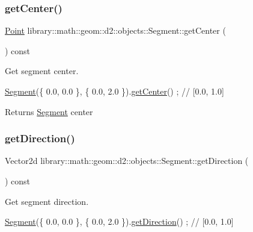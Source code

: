 \subsubsection{\texorpdfstring{get\+Center()}{getCenter()}}
{\footnotesize\ttfamily \hyperlink{classlibrary_1_1math_1_1geom_1_1d2_1_1objects_1_1_point}{Point} library\+::math\+::geom\+::d2\+::objects\+::\+Segment\+::get\+Center (\begin{DoxyParamCaption}{ }\end{DoxyParamCaption}) const}



Get segment center. 


\begin{DoxyCode}
\hyperlink{classlibrary_1_1math_1_1geom_1_1d2_1_1objects_1_1_segment_a44ba44fd5f02a02fe34c40223b38fa8f}{Segment}(\{ 0.0, 0.0 \}, \{ 0.0, 2.0 \}).\hyperlink{classlibrary_1_1math_1_1geom_1_1d2_1_1objects_1_1_segment_a964684b33e11314a0b818fb089a197e6}{getCenter}() ; \textcolor{comment}{// [0.0, 1.0]}
\end{DoxyCode}


\begin{DoxyReturn}{Returns}
\hyperlink{classlibrary_1_1math_1_1geom_1_1d2_1_1objects_1_1_segment}{Segment} center 
\end{DoxyReturn}
\mbox{\label{classlibrary_1_1math_1_1geom_1_1d2_1_1objects_1_1_segment_af7b2a7dbc7be4941740699a93c63a690}} 
\subsubsection{\texorpdfstring{get\+Direction()}{getDirection()}}
{\footnotesize\ttfamily Vector2d library\+::math\+::geom\+::d2\+::objects\+::\+Segment\+::get\+Direction (\begin{DoxyParamCaption}{ }\end{DoxyParamCaption}) const}



Get segment direction. 


\begin{DoxyCode}
\hyperlink{classlibrary_1_1math_1_1geom_1_1d2_1_1objects_1_1_segment_a44ba44fd5f02a02fe34c40223b38fa8f}{Segment}(\{ 0.0, 0.0 \}, \{ 0.0, 2.0 \}).\hyperlink{classlibrary_1_1math_1_1geom_1_1d2_1_1objects_1_1_segment_af7b2a7dbc7be4941740699a93c63a690}{getDirection}() ; \textcolor{comment}{// [0.0, 1.0]}
\end{DoxyCode}



